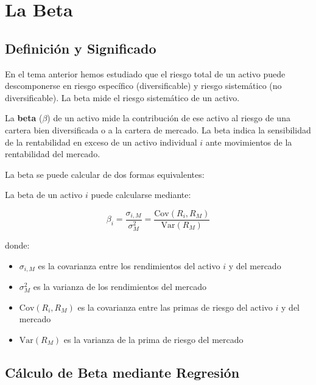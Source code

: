 \section{La Beta}

\subsection{Definición y Significado}

En el tema anterior hemos estudiado que el riesgo total de un activo puede descomponerse en riesgo específico (diversificable) y riesgo sistemático (no diversificable). La beta mide el riesgo sistemático de un activo.

\begin{definicion}[Beta]
La \textbf{beta} ($\beta$) de un activo mide la contribución de ese activo al riesgo de una cartera bien diversificada o a la cartera de mercado. La beta indica la sensibilidad de la rentabilidad en exceso de un activo individual \(i\) ante movimientos de la rentabilidad del mercado.
\end{definicion}

La beta se puede calcular de dos formas equivalentes:

\begin{teorema}
La beta de un activo $i$ puede calcularse mediante:

\begin{equation}
\beta_i = \frac{\sigma_{i,M}}{\sigma_M^2} = \frac{\text{Cov}(R_i, R_M)}{\text{Var}(R_M)}
\end{equation}

donde:
\begin{itemize}
\item $\sigma_{i,M}$ es la covarianza entre los rendimientos del activo $i$ y del mercado
\item $\sigma_M^2$ es la varianza de los rendimientos del mercado
\item $\text{Cov}(R_i, R_M)$ es la covarianza entre las primas de riesgo del activo $i$ y del mercado
\item $\text{Var}(R_M)$ es la varianza de la prima de riesgo del mercado
\end{itemize}
\end{teorema}

\subsection{Cálculo de Beta mediante Regresión}


